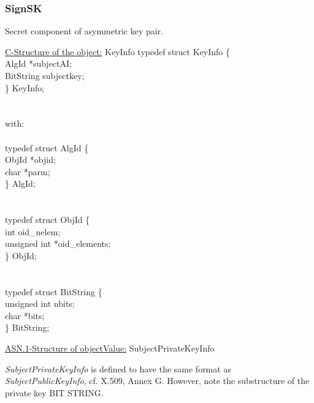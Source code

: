 \subsubsection{SignSK}
Secret component of asymmetric key pair.

\underline{C-Structure of the object:} KeyInfo
{\small
\bvtab
\4      typedef struct KeyInfo \{ \\
\6              AlgId        \3 *subjectAI; \\
\6              BitString    \3 subjectkey; \\
\4      \} KeyInfo; \\ \\ \\
with: \\ \\
\4      typedef struct AlgId \{  \\
\6              ObjId  \3 *objid; \\
\6              char         \3 *parm; \\
\4      \} AlgId; \\ \\ \\
\4      typedef struct ObjId \{  \\
\6              int          \3 oid\_nelem; \\
\6              unsigned int \3 *oid\_elements; \\
\4      \} ObjId;  \\  \\ \\
\4      typedef struct BitString \{  \\
\6              unsigned int \3 nbits; \\
\6              char         \3 *bits; \\
\4      \} BitString;  \\
\evtab
}

\underline{ASN.1-Structure of objectValue:}
{\small
\bvtab
\4 SubjectPrivateKeyInfo
\evtab
}

{\em SubjectPrivateKeyInfo} is defined to have the same format as
{\em SubjectPublicKeyInfo}, cf. X.509, Annex G.
However, note the substructure of the private key BIT STRING.

